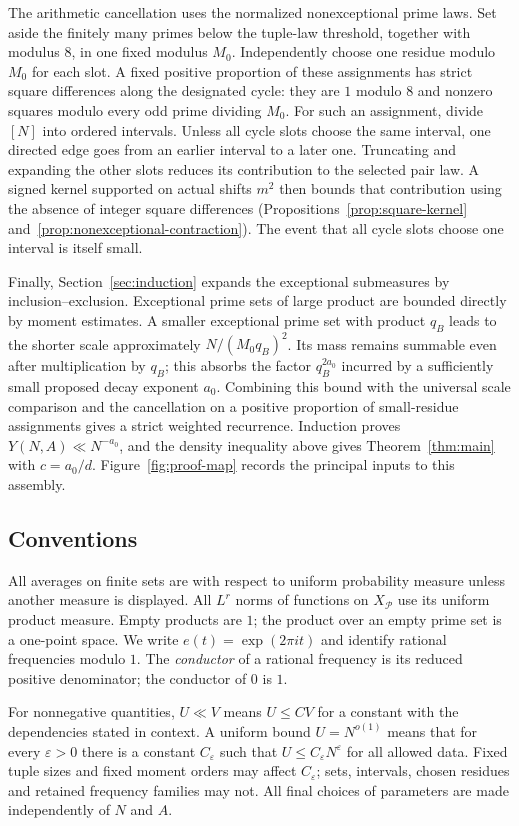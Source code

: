 The arithmetic cancellation uses the normalized nonexceptional prime laws.
Set aside the finitely many primes below the tuple-law threshold, together
with modulus $8$, in one fixed modulus $M_0$. Independently choose one
residue modulo $M_0$ for each slot. A fixed positive proportion of these
assignments has strict square differences along the designated cycle:
they are $1$ modulo $8$ and nonzero squares modulo every odd prime
dividing $M_0$.
For such an assignment, divide $[N]$ into ordered intervals. Unless all
cycle slots choose the same interval, one directed edge goes from an
earlier interval to a later one. Truncating and expanding the other slots
reduces its contribution to the selected pair law. A signed kernel
supported on actual shifts $m^2$ then bounds that contribution using the
absence of integer square differences
(Propositions~\ref{prop:square-kernel} and~\ref{prop:nonexceptional-contraction}).
The event that all cycle slots choose one interval is itself small.

Finally, Section~\ref{sec:induction} expands the exceptional submeasures
by inclusion--exclusion. Exceptional prime sets of large product are
bounded directly by moment estimates. A smaller exceptional prime set
with product $q_B$ leads to the shorter scale approximately $N/(M_0q_B)^2$.
Its mass remains summable even after multiplication by $q_B$; this absorbs
the factor $q_B^{2a_0}$ incurred by a sufficiently small proposed decay
exponent $a_0$. Combining this bound with the universal scale comparison
and the cancellation on a positive proportion of small-residue assignments
gives a strict weighted recurrence. Induction proves
$Y(N,A)\ll N^{-a_0}$, and the density inequality above gives
Theorem~\ref{thm:main} with $c=a_0/d$.
Figure~\ref{fig:proof-map} records the principal inputs to this assembly.


\subsection{Conventions}

All averages on finite sets are with respect to uniform probability
measure unless another measure is displayed. All $L^r$ norms of functions
on $X_{\mathcal P}$ use its uniform product measure. Empty products are
$1$; the product over an empty prime set is a one-point space. We write
$e(t)=\exp(2\pi i t)$ and identify rational frequencies modulo $1$.
The \emph{conductor} of a rational frequency is its reduced positive
denominator; the conductor of $0$ is $1$.

For nonnegative quantities, $U\ll V$ means $U\le C V$ for a constant
with the dependencies stated in context. A uniform bound $U=N^{o(1)}$
means that for every $\varepsilon>0$ there is a constant
$C_\varepsilon$ such that $U\le C_\varepsilon N^\varepsilon$ for all
allowed data. Fixed tuple sizes and fixed moment orders may affect
$C_\varepsilon$; sets, intervals, chosen residues and retained frequency
families may not. All final choices of parameters are made independently
of $N$ and $A$.

